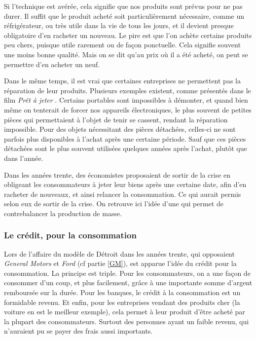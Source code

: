 Si l'\op technique est avérée, cela signifie que nos produits sont prévus pour ne pas durer. Il suffit que le produit acheté soit particulièrement nécessaire, comme un réfrigérateur, ou très utile dans la vie de tous les jours, et il devient presque obligatoire d'en racheter un nouveau. Le pire est que l'on achète certains produits peu chers, puisque utile rarement ou de façon ponctuelle. Cela signifie souvent une moins bonne qualité. Mais on se dit qu'au prix où il a été acheté, on peut se permettre d'en acheter un neuf.

\bigbreak
Dans le même temps, il est vrai que certaines entreprises ne permettent pas la réparation de leur produits. Plusieurs exemples existent, comme présentés dans le film \textit{Prêt à jeter} \cite{PretAjeter}. Certains portables sont impossibles à démonter, et quand bien même on tenterait de forcer nos appareils électroniques, le plus souvent de petites pièces qui permettaient à l'objet de tenir se cassent, rendant la réparation impossible. Pour des objets nécessitant des pièces détachées, celles-ci ne sont parfois plus disponibles à l'achat après une certaine période. Sauf que ces pièces détachées sont le plus souvent utilisées quelques années après l'achat, plutôt que dans l'année.

\bigbreak
Dans les années trente, des économistes proposaient de sortir de la crise en obligeant les consommateurs à jeter leur biens après une certaine date, afin d'en racheter de nouveaux, et ainsi relancer la consommation. Ce qui aurait permis selon eux de sortir de la crise. On retrouve ici l'idée d'une \op qui permet de contrebalancer la production de masse. 


\subsubsection{Le crédit, pour la consommation}
Lors de l'affaire du modèle de Détroit dans les années trente, qui opposaient \textit{General Motors} et \textit{Ford} (cf partie \ref{GM}), est apparue l'idée du crédit pour la consommation. La principe est triple. Pour les consommateurs, on a une façon de consommer d'un coup, et plus facilement, grâce à une importante somme d'argent remboursée sur la durée. Pour les banques, le crédit à la consommation est un formidable revenu. Et enfin, pour les entreprises vendant des produits cher (la voiture en est le meilleur exemple), cela permet à leur produit d'être acheté par la plupart des consommateurs. Surtout des personnes ayant un faible revenu, qui n'auraient pu se payer des frais aussi importants.

